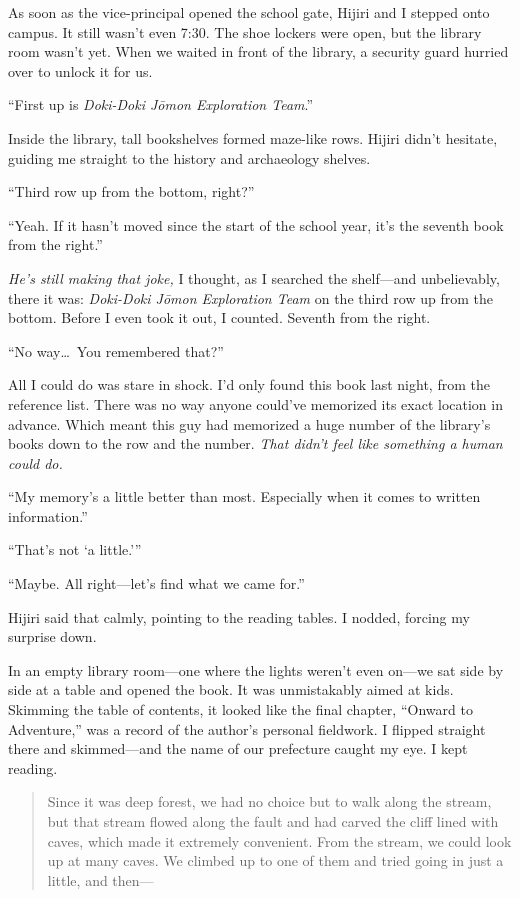 \documentclass[
    a4paper,
    12pt,
    twoside,
    openany,
    UTF8,
    fontset=windows
]{ctexbook}
\begin{document}
As soon as the vice-principal opened the school gate, Hijiri and I stepped onto campus. It still wasn't even 7:30. The shoe lockers were open, but the library room wasn't yet. When we waited in front of the library, a security guard hurried over to unlock it for us.

``First up is \textit{Doki-Doki J\=omon Exploration Team}.''

Inside the library, tall bookshelves formed maze-like rows. Hijiri didn't hesitate, guiding me straight to the history and archaeology shelves.

``Third row up from the bottom, right?''

``Yeah. If it hasn't moved since the start of the school year, it's the seventh book from the right.''

\textit{He's still making that joke,} I thought, as I searched the shelf---and unbelievably, there it was: \textit{Doki-Doki J\=omon Exploration Team} on the third row up from the bottom. Before I even took it out, I counted. Seventh from the right.

``No way\dots\ You remembered that?''

All I could do was stare in shock. I'd only found this book last night, from the reference list. There was no way anyone could've memorized its exact location in advance. Which meant this guy had memorized a huge number of the library's books down to the row and the number. \textit{That didn't feel like something a human could do.}

``My memory's a little better than most. Especially when it comes to written information.''

``That's not `a little.'''

``Maybe. All right---let's find what we came for.''

Hijiri said that calmly, pointing to the reading tables. I nodded, forcing my surprise down.

In an empty library room---one where the lights weren't even on---we sat side by side at a table and opened the book. It was unmistakably aimed at kids. Skimming the table of contents, it looked like the final chapter, ``Onward to Adventure,'' was a record of the author's personal fieldwork. I flipped straight there and skimmed---and the name of our prefecture caught my eye. I kept reading.

{\bfseries
\begin{quote}
Since it was deep forest, we had no choice but to walk along the stream, but that stream flowed along the fault and had carved the cliff lined with caves, which made it extremely convenient. From the stream, we could look up at many caves. We climbed up to one of them and tried going in just a little, and then---
\end{quote}
}
\end{document}
